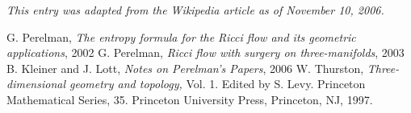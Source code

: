 \documentclass[12pt]{article}
\begin{document}
{\it This entry was adapted from the Wikipedia article  as of November 10, 2006.}

\begin{thebibliography}{4}
 G. Perelman, {\it The entropy formula for the Ricci flow and its geometric applications}, 2002
 G. Perelman, {\it Ricci flow with surgery on three-manifolds}, 2003
 B. Kleiner and J. Lott, {\it Notes on Perelman's Papers}, 2006
 W. Thurston, {\it Three-dimensional geometry and topology,} Vol. 1. Edited by S. Levy. Princeton Mathematical Series, 35. Princeton University Press, Princeton, NJ, 1997. \end{thebibliography}
\end{document}
